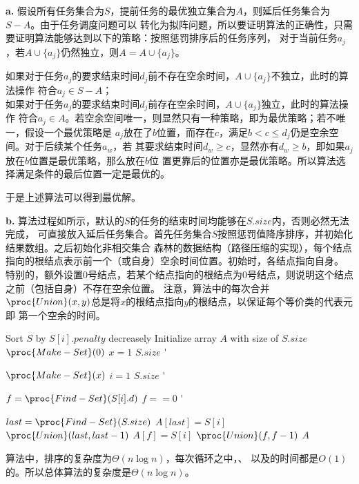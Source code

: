 \begin{solution}
\textbf{a.}
假设所有任务集合为$S$，提前任务的最优独立集合为$A$，则延后任务集合为$S-A$。由于任务调度问题可以
转化为拟阵问题，所以要证明算法的正确性，只需要证明算法能够达到以下的策略：按照惩罚排序后的任务序列，
对于当前任务$a_j$，若$A\cup \{a_j\}$仍然独立，则$A = A\cup \{a_j\}$。

如果对于任务$a_j$的要求结束时间$d_j$前不存在空余时间，$A\cup \{a_j\}$不独立，此时的算法操作
符合$a_j \in S-A$；\\
如果对于任务$a_j$的要求结束时间$d_j$前存在空余时间，$A\cup \{a_j\}$独立，此时的算法操作
符合$a_j \in A$。若空余空间唯一，则显然只有一种策略，即为最优策略；若不唯一，假设一个最优策略是
$a_j$放在了$b$位置，而存在$c$，满足$b < c \le d_j$仍是空余空间。对于后续某个任务$a_w$，若
其要求结束时间$d_w \ge c$，显然亦有$d_w \ge b$，即如果$a_j$放在$b$位置是最优策略，那么放在$b$位
置更靠后的位置亦是最优策略。所以算法选择满足条件的最后位置一定是最优的。

于是上述算法可以得到最优解。

\textbf{b.}
算法过程如所示，默认的$S$的任务的结束时间均能够在$S.size$内，否则必然无法完成，
可直接放入延后任务集合。首先任务集合$S$按照惩罚值降序排序，并初始化结果数组。之后初始化非相交集合
森林的数据结构（路径压缩的实现），每个结点指向的根结点表示前一个（或自身）空余时间位置。初始时，各结点指向自身。
特别的，额外设置0号结点，若某个结点指向的根结点为0号结点，则说明这个结点之前（包括自身）不存在空余位置。
注意，算法中的每次合并$\proc{Union}(x,y)$总是将$x$的根结点指向$y$的根结点，以保证每个等价类的代表元即
第一个空余的时间。
\newcommand{\Doo}{\>\textbf{}\hspace*{-0.7em}\'\addtocounter{indent}{1}}
\begin{codebox}
    \li Sort $S$ by $S[i].penalty$ decreasely
    \li Initialize array $A$ with size of $S.size$
    \li $\proc{Make-Set}(0)$
    \li \For $x = 1$ \To $S.size$ \Doo
    \li     $\proc{Make-Set}(x)$ \End
    \li \For $i = 1$ \To $S.size$ \Doo
    \li     $f = \proc{Find-Set}(S[i].d)$
    \li     \If $f == 0$ \Doo
    \li         $last = \proc{Find-Set}(S.size)$
    \li         $A[last] = S[i]$
    \li         $\proc{Union}(last,last - 1)$
    \li     \Else 
    \li         $A[f] = S[i]$
    \li         $\proc{Union}(f,f - 1)$ \End \End \End
    \li \Return $A$
\end{codebox}

算法中，排序的复杂度为$\Theta(n\log n)$，每次循环之中，、
以及的时间都是$O(1)$的。所以总体算法的复杂度是$\Theta(n\log n)$。
\end{solution}